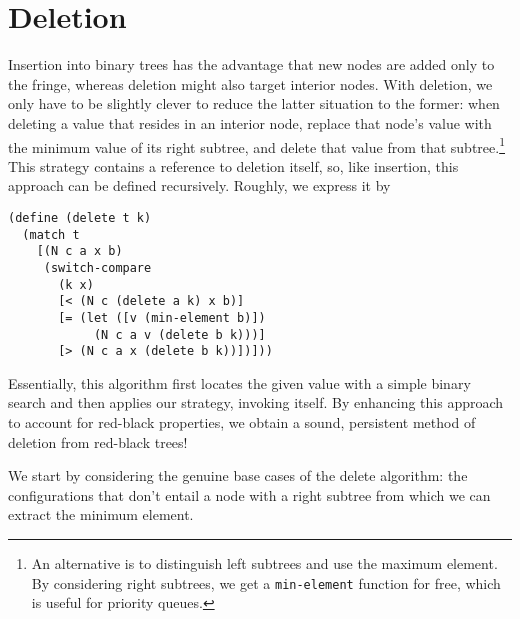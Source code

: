 \documentclass[preprint]{sigplanconf}
\begin{document}
\section{Deletion}

Insertion into binary trees has the advantage that new nodes are added only to the fringe, whereas deletion might also target interior nodes. With deletion, we only have to be slightly clever to reduce the latter situation to the former: when deleting a value that resides in an interior node, replace that node's value with the minimum value of its right subtree, and delete that value from that subtree.\footnote{An alternative is to distinguish left subtrees and use the maximum element. By considering right subtrees, we get a \texttt{min-element} function for free, which is useful for priority queues.} This strategy contains a reference to deletion itself, so, like insertion, this approach can be defined recursively. Roughly, we express it by
\begin{verbatim}
(define (delete t k)
  (match t
    [(N c a x b)
     (switch-compare
       (k x)
       [< (N c (delete a k) x b)]
       [= (let ([v (min-element b)])
            (N c a v (delete b k)))]
       [> (N c a x (delete b k))])]))
\end{verbatim}
Essentially, this algorithm first locates the given value with a simple binary search and then applies our strategy, invoking itself. By enhancing this approach to account for red-black properties, we obtain a sound, persistent method of deletion from red-black trees!

We start by considering the genuine base cases of the delete algorithm: the configurations that don't entail a node with a right subtree from which we can extract the minimum element.
\end{document}
